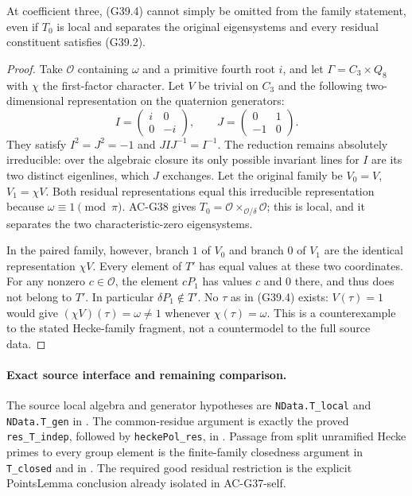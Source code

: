 \begin{proposition}
\label{AC-G39-necessity}
At coefficient three, (G39.4) cannot simply be omitted
from the family statement, even if $T_0$ is local and
separates the original eigensystems and every residual
constituent satisfies (G39.2).
\end{proposition}
\begin{proof}
Take $\mathcal O$ containing $\omega$ and a primitive
fourth root $i$, and let $\Gamma=C_3\times Q_8$ with
$\chi$ the first-factor character.  Let $V$ be trivial
on $C_3$ and the following two-dimensional representation
on the quaternion generators:
\[
     I=\begin{pmatrix}i&0\\0&-i\end{pmatrix},\qquad
     J=\begin{pmatrix}0&1\\-1&0\end{pmatrix}.
\]
They satisfy $I^2=J^2=-1$ and $JIJ^{-1}=I^{-1}$.
The reduction remains absolutely irreducible: over the
algebraic closure its only possible invariant lines for
$I$ are its two distinct eigenlines, which $J$ exchanges.
Let the original family be $V_0=V$, $V_1=\chi V$.
Both residual representations equal this irreducible
representation because $\omega\equiv1\pmod\pi$.
AC-G38 gives
$T_0=\mathcal O\times_{\mathcal O/\delta}\mathcal O$;
this is local, and it separates the two characteristic-zero
eigensystems.

In the paired family, however, branch $1$ of $V_0$ and
branch $0$ of $V_1$ are the identical representation
$\chi V$.  Every element of $T'$ has equal values at
these two coordinates.  For any nonzero $c\in\mathcal O$,
the element $cP_1$ has values $c$ and $0$ there, and thus
does not belong to $T'$.  In particular $\delta P_1\notin T'$.
No $\tau$ as in (G39.4) exists: $V(\tau)=1$ would give
$(\chi V)(\tau)=\omega\ne1$ whenever $\chi(\tau)=\omega$.
This is a counterexample to the stated Hecke-family
fragment, not a countermodel to the full source data.
\end{proof}

\paragraph{Exact source interface and remaining comparison.}
The source local algebra and generator hypotheses are
\texttt{NData.T\_local} and \texttt{NData.T\_gen} in
.
The common-residue argument is exactly the proved
\texttt{res\_T\_indep}, followed by \texttt{heckePol\_res}, in
.
Passage from split unramified Hecke primes to every group
element is the finite-family closedness argument in
\texttt{T\_closed} and
in .
The required good residual restriction is the explicit
PointsLemma conclusion already isolated in AC-G37-self.

